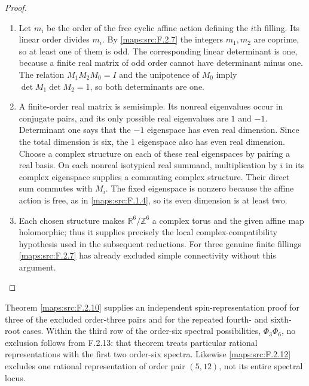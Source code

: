 \documentclass[11pt,a4paper]{article}
\theoremstyle{definition}
\begin{document}
\begin{proof}
\begin{enumerate}[label=\arabic*.]
\item Let $m_i$ be the order of the free cyclic affine action
defining the $i$th filling.  Its linear order divides $m_i$.
By \ref{maps:src:F.2.7} the integers $m_1,m_2$ are coprime, so at least one
of them is odd.  The corresponding linear determinant is
one, because a finite real matrix of odd order cannot have
determinant minus one.  The relation
$M_1M_2M_0=I$ and the unipotence of $M_0$ imply
$\det M_1\det M_2=1$, so both determinants are one.

\item A finite-order real matrix is semisimple.  Its nonreal
eigenvalues occur in conjugate pairs, and its only possible
real eigenvalues are $1$ and $-1$.  Determinant one says
that the $-1$ eigenspace has even real dimension.  Since the
total dimension is six, the $1$ eigenspace also has even
real dimension.  Choose a complex structure on each of
these real eigenspaces by pairing a real basis.  On each
nonreal isotypical real summand, multiplication by $i$ in
its complex eigenspace supplies a commuting complex
structure.  Their direct sum commutes with $M_i$.
The fixed eigenspace is nonzero because the affine action
is free, as in \ref{maps:src:F.1.4}, so its even dimension is at least two.

\item Each chosen structure makes $\mathbb R^6/\mathbb Z^6$ a
complex torus and the given affine map holomorphic; thus it
supplies precisely the local complex-compatibility
hypothesis used in the subsequent reductions.  For three genuine
finite fillings \ref{maps:src:F.2.7} has already excluded simple
connectivity without this argument.

\end{enumerate}
\end{proof}


Theorem \ref{maps:src:F.2.10} supplies an independent spin-representation
proof for three of the excluded order-three pairs and for
the repeated fourth- and sixth-root cases.
Within the third row of the order-six spectral possibilities,
$\Phi_3\Phi_6$, no exclusion follows from F.2.13: that theorem
treats particular rational representations with the first
two order-six spectra.  Likewise \ref{maps:src:F.2.12} excludes one
rational representation of order pair $(5,12)$, not its
entire spectral locus.
\end{document}
